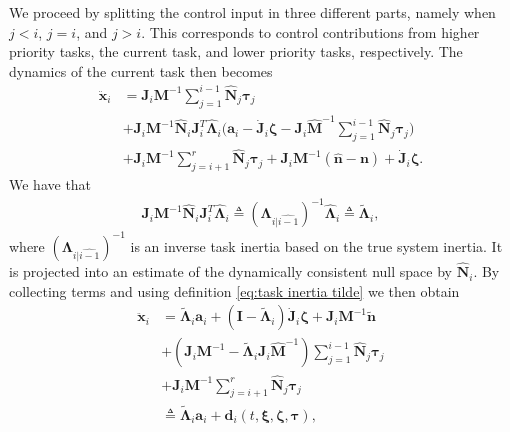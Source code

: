 \documentclass[../main.tex]{subfiles}
\begin{document}
We proceed by splitting the control input in three different parts, namely when $j<i$, $j=i$, and $j>i$. This corresponds to control contributions from higher priority tasks, the current task, and lower priority tasks, respectively. The dynamics of the current task then becomes
\begin{equation}
    \label{eq:task_dynamics_err_split}
    \begin{aligned}
        \ddot{\bm{x}}_i &=
        \bm{J}_i\bm{M}^{-1} \sum_{j=1}^{i-1}\hat{\bm{N}}_j\bm{\tau}_j \\ &+
        \bm{J}_i\bm{M}^{-1}\hat{\bm{N}}_i\bm{J}_i^T\hat{\bm{\Lambda}}_i \bigg(\bm{a}_i-\dot{\bm{J}}_i\bm{\zeta}-\bm{J}_i\hat{\bm{M}}^{-1} \sum_{j=1}^{i-1}\hat{\bm{N}}_j\bm{\tau}_j \bigg) \\&+ \bm{J}_i\bm{M}^{-1} \sum_{j=i+1}^{r}\hat{\bm{N}}_j\bm{\tau}_j + \bm{J}_i\bm{M}^{-1}(\hat{\bm{n}}-\bm{n}) + \dot{\bm{J}}_i\bm{\zeta}.
    \end{aligned}
\end{equation}
We have that
\begin{equation}
    \label{eq:task inertia tilde}
    \begin{aligned}
    \bm{J}_i\bm{M}^{-1}\hat{\bm{N}}_i\bm{J}_i^T\hat{\bm{\Lambda}}_i
     \triangleq (\bm{\Lambda}_{i|\widehat{i-1}})^{-1} \hat{\bm{\Lambda}}_i \triangleq \tilde{\bm{\Lambda}}_i,
    \end{aligned}
\end{equation}
where $(\bm{\Lambda}_{i|\widehat{i-1}})^{-1}$ is an inverse task inertia based on the true system inertia. It is projected into an estimate of the dynamically consistent null space by $\hat{\bm{N}}_i$. By collecting terms and using definition \eqref{eq:task inertia tilde} we then obtain
\begin{equation}\label{eq:CL model errors}
    \begin{aligned}
    \ddot{\bm{x}}_i &= \tilde{\bm{\Lambda}}_i \bm{a}_i + \left(\bm{I}-\tilde{\bm{\Lambda}}_i\right) \dot{\bm{J}}_i\bm{\zeta} + \bm{J}_i\bm{M}^{-1}\tilde{\bm{n}} \\&+ \left(\bm{J}_i\bm{M}^{-1} - \tilde{\bm{\Lambda}}_i \bm{J}_i\hat{\bm{M}}^{-1}\right)\sum_{j=1}^{i-1}\hat{\bm{N}}_j\bm{\tau}_j \\&+ \bm{J}_i\bm{M}^{-1}\sum_{j=i+1}^{r}\hat{\bm{N}}_j\bm{\tau}_j \\&\triangleq \tilde{\bm{\Lambda}}_i\bm{a}_i + \bm{d}_i(t, \bm{\xi}, \bm{\zeta}, \bm{\tau}),
    \end{aligned}
\end{equation}
\end{document}
